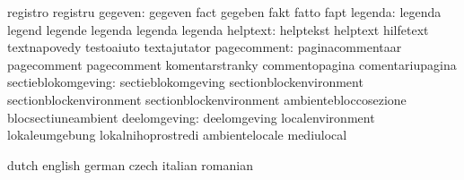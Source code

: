                            registro                  registru
                  gegeven: gegeven                   fact
                           gegeben                   fakt
                           fatto                     fapt
                  legenda: legenda                   legend
                           legende                   legenda
                           legenda                   legenda
                 helptext: helptekst                 helptext
                           hilfetext                 textnapovedy
                           testoaiuto                textajutator
              pagecomment: paginacommentaar          pagecomment
                           pagecomment               komentarstranky
                           commentopagina            comentariupagina %
       sectieblokomgeving: sectieblokomgeving        sectionblockenvironment
                           sectionblockenvironment   sectionblockenvironment
                           ambientebloccosezione     blocsectiuneambient %
             deelomgeving: deelomgeving              localenvironment
                           lokaleumgebung            lokalnihoprostredi
                           ambientelocale            mediulocal

\stopelements




\startvariables            dutch                     english
                           german                    czech
                           italian                   romanian

